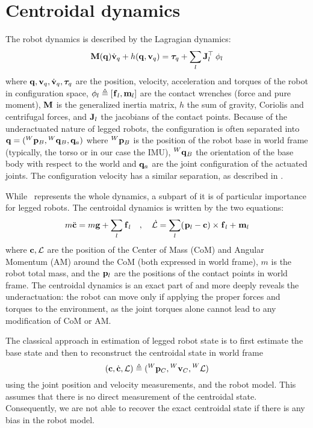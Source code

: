 \section{Centroidal dynamics}
\label{sec:centroidal_dynamics}
The robot dynamics is described by the Lagragian dynamics:
%
\begin{equation}\label{eq:wbdyn}
  {\bf M}({\bf q}) \dot{{\bf v}}_q + h({\bf q},{\bf v}_q) = \bm\tau_q + \sum_l {\bf J}_l^{\top} \prescript{}{}{\bf \phi}_{l}
\end{equation}
%
where ${\bf q},{\bf v}_q,\dot{{\bf v}}_q,\bm\tau_q$ are the position, velocity, acceleration and torques of the robot in configuration space,
$\prescript{}{}{\bf \phi}_{l} \triangleq [\prescript{}{}{{\bf f}}_{l},{\bf m}_l]$ are the contact wrenches (force and pure moment),
${\bf M}$ is the generalized inertia matrix, $h$ the sum of gravity, Coriolis and centrifugal forces, and ${\bf J}_l$ the jacobians of the contact points.
Because of the underactuated nature of legged robots, the configuration is often separated into ${\bf q}=(\prescript{W}{}{{\bf p}}_{B}, \prescript{W}{}{{\bf q}}_B ,{\bf q}_a)$ where $\prescript{W}{}{{\bf p}}_{B}$ 
is the position of the robot base in world frame (typically, the torso or in our case the IMU), $\prescript{W}{}{{\bf q}}_B$ the orientation of the base body with respect 
to the world and ${\bf q}_a$ are the joint configuration of the actuated joints. The configuration velocity has a similar separation, as described in .

While~ represents the whole dynamics, a subpart of it is of particular importance for legged robots.
The centroidal dynamics is written by the two equations:
%
\begin{equation}
    m \ddot{{\bf c}} = m {\bf g} + \sum_l \prescript{}{}{{\bf f}}_{l} \quad , \quad
\mathcal{\dot{L}} = \sum_l (\prescript{}{}{{\bf p}}_{l} - {\bf c}) \times \prescript{}{}{{\bf f}}_{l} + \prescript{}{}{\bf m}_{l}
\label{eq:NewtonEuler}
\end{equation}
%
where ${\bf c},\mathcal{L}$ are the position of the Center of Mass (CoM) and Angular Momentum (AM) around the CoM (both expressed in world frame), $m$ is the robot total mass, 
and the $\prescript{}{}{{\bf p}}_{l}$ are the positions of the contact points in world frame. The centroidal dynamics is an exact part of  and more deeply reveals 
the underactuation: the robot can move only if applying the proper forces and torques to the environment, as the joint torques alone cannot lead to any modification 
of CoM or AM.

The classical approach in estimation of legged robot state is to first estimate the base state and then to reconstruct the centroidal state in world frame
%
\begin{equation}
    ({\bf c},\dot{{\bf c}},\mathcal{L}) \triangleq (\prescript{W}{}{{\bf p}}_{C},\prescript{W}{}{{\bf v}}_{C},\prescript{W}{}{\mathcal{L}})
\end{equation}
%
using the joint position and velocity measurements, and the robot model. This assumes that there is no direct measurement of the centroidal state.
Consequently, we are not able to recover the exact centroidal state if there is any bias in the robot model.

